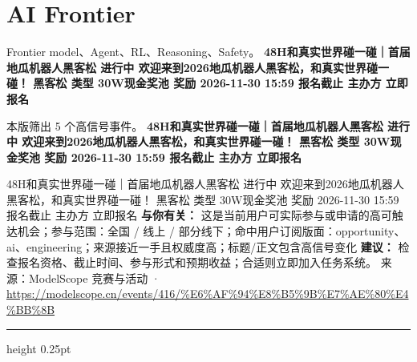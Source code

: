 \documentclass[10.5pt]{ctexart}
\begin{document}
\section*{AI Frontier}
{\color{ormuted} Frontier model、Agent、RL、Reasoning、Safety。}
\vspace{2mm}
{\LARGE\bfseries 48H和真实世界碰一碰｜首届地瓜机器人黑客松 进行中 欢迎来到2026地瓜机器人黑客松，和真实世界碰一碰！ 黑客松 类型 30W现金奖池 奖励 2026-11-30 15:59 报名截止 主办方 立即报名}\par
\vspace{1mm}
{\color{ormuted} 本版筛出 5 个高信号事件。}
\vspace{3mm}
{\Large\bfseries 48H和真实世界碰一碰｜首届地瓜机器人黑客松 进行中 欢迎来到2026地瓜机器人黑客松，和真实世界碰一碰！ 黑客松 类型 30W现金奖池 奖励 2026-11-30 15:59 报名截止 主办方 立即报名}\par
48H和真实世界碰一碰｜首届地瓜机器人黑客松 进行中 欢迎来到2026地瓜机器人黑客松，和真实世界碰一碰！ 黑客松 类型 30W现金奖池 奖励 2026-11-30 15:59 报名截止 主办方 立即报名
\textbf{与你有关：} 这是当前用户可实际参与或申请的高可触达机会；参与范围：全国 / 线上 / 部分线下；命中用户订阅版面：opportunity、ai、engineering；来源接近一手且权威度高；标题/正文包含高信号变化
\textbf{建议：} 检查报名资格、截止时间、参与形式和预期收益；合适则立即加入任务系统。
{\footnotesize\color{ormuted} 来源：ModelScope 竞赛与活动 · \url{https://modelscope.cn/events/416/%E6%AF%94%E8%B5%9B%E7%AE%80%E4%BB%8B}}
\vspace{4mm}
\hrule height 0.25pt
\vspace{3mm}
\end{document}
